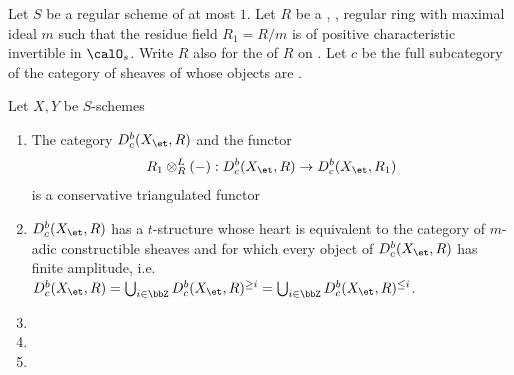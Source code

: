 \begin{theorem} \label{theorem:six_functor_formalism_of_ekedahls_adic_categories_on_schemes}
     Let $S$ be a regular scheme of  at most $1$. Let $R$ be a , , regular ring with maximal ideal $m$ such that the residue field $R_1 = R/m$ is of positive characteristic invertible in $\calO_s$. Write $R$ also for the   of $R$ on . Let $c$ be the full subcategory of the category of sheaves of  whose objects are .

     Let $X,Y$ be $S$-schemes
     \begin{enumerate}
        \item The category $D_c^b(X_{\et}, R)$ and the functor
        $$R_1 \otimes_R^L (-): D_c^b(X_{\et}, R) \to D_c^b(X_{\et}, R_1)$$
        is a conservative triangulated functor 

        \item $D_c^b(X_{\et}, R)$ has a $t$-structure \TODO{} whose heart is equivalent to the category of $m$-adic constructible sheaves and for which every object of $D_c^b(X_{\et}, R)$ has finite amplitude, i.e. $D_c^b(X_{\et}, R) = \bigcup_{i \in \bbZ} D_c^b(X_{\et}, R)^{\geq i} = \bigcup_{i \in \bbZ} D_c^b(X_{\et}, R)^{\leq i}$. 

        \item {}
        \item {}
        \item {}
     \end{enumerate}
\end{theorem}